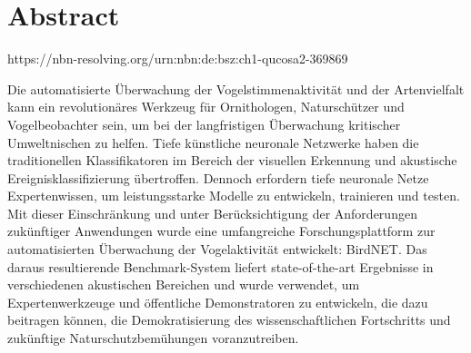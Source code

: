 \section{Abstract}

https://nbn-resolving.org/urn:nbn:de:bsz:ch1-qucosa2-369869


Die automatisierte Überwachung der Vogelstimmenaktivität und der Artenvielfalt kann ein revolutionäres Werkzeug für Ornithologen, Naturschützer und Vogelbeobachter sein, um bei der langfristigen Überwachung kritischer Umweltnischen zu helfen. Tiefe künstliche neuronale Netzwerke haben die traditionellen Klassifikatoren im Bereich der visuellen Erkennung und akustische Ereignisklassifizierung übertroffen. Dennoch erfordern tiefe neuronale Netze Expertenwissen, um leistungsstarke Modelle zu entwickeln, trainieren und testen. Mit dieser Einschränkung und unter Berücksichtigung der Anforderungen zukünftiger Anwendungen wurde eine umfangreiche Forschungsplattform zur automatisierten Überwachung der Vogelaktivität entwickelt: BirdNET. Das daraus resultierende Benchmark-System liefert state-of-the-art Ergebnisse in verschiedenen akustischen Bereichen und wurde verwendet, um Expertenwerkzeuge und öffentliche Demonstratoren zu entwickeln, die dazu beitragen können, die Demokratisierung des wissenschaftlichen Fortschritts und zukünftige Naturschutzbemühungen voranzutreiben.
